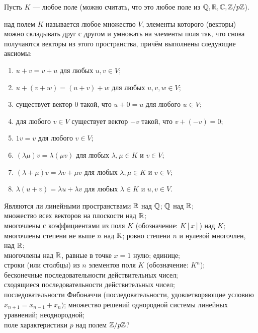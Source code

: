 \documentclass[a4paper,12pt]{article}
\begin{document}
	
Пусть $K$ --- любое поле (можно считать, что это любое поле из $\mathbb{Q}, \mathbb{R}, \mathbb{C}, \mathbb{Z}/p\mathbb{Z}$).
		

  над полем
$K$ называется любое множество $V$, элементы которого (векторы)
можно складывать друг с другом и умножать на элементы поля так, что снова получаются векторы из этого пространства, причём
выполнены следующие аксиомы:
\begin{enumerate}
  \item $u + v = v + u$ для любых $u,v\in V$;
  \item $u + (v + w) = (u + v) + w$ для любых $u, v, w \in V$;
  \item существует  вектор $0$ такой, что $u + 0 = u$
  для любого $u \in V$;
  \item для любого $v \in V$ существует 
  вектор $-v$ такой, что $v + (-v) = 0$;
  \item $1v = v$ для любого $v \in V$;
  \item $(\lambda\mu)v = \lambda(\mu v)$ для любых $\lambda,\mu \in K$ и $v \in V$;
  \item $(\lambda+\mu)v = \lambda v + \mu v$ для любых $\lambda,\mu \in K$ и $v \in V$;
  \item $\lambda(u + v) = \lambda u + \lambda v$ для любых $\lambda \in K$ и $u, v \in V$.
\end{enumerate}

		Являются ли линейными пространствами
	 $\mathbb{R}$ над $\mathbb{Q}$;  $\mathbb{Q}$ над $\mathbb{R}$;\\
     множество всех векторов на плоскости над $\mathbb{R}$;	\\
	 многочлены с коэффициентами из поля $K$ (обозначение: $K[x]$) над $K$;\\
	 многочлены степени не выше $n$ над $\mathbb{R}$; ровно степени $n$ и нулевой многочлен, над $\mathbb{R}$;\\
	 многочлены над $\mathbb{R}$, равные в точке $x=1$ нулю; единице;\\
	 строки (или столбцы) из $n$ элементов поля $K$ (обозначение: $K^n$);\\
	 бесконечные последовательности действительных чисел;\\
	 сходящиеся последовательности действительных чисел;\\
	 последовательности Фибоначчи (последовательности, удовлетворяющие условию $x_{n+1} = x_{n-1}+x_n)$;
	 множество решений однородной системы линейных уравнений; неоднородной;\\
     поле характеристики $p$ над полем $\mathbb{Z}/p\mathbb{Z}$?
\end{document}
